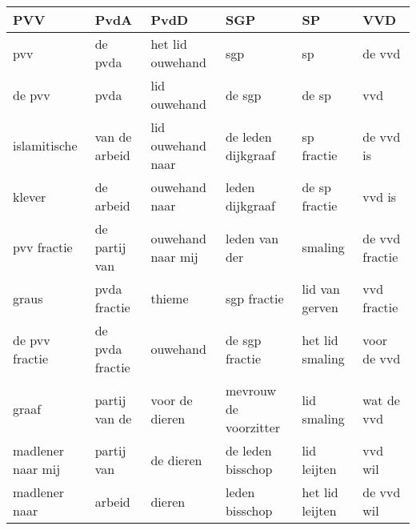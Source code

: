 \begin{tabular}{llllll}
\toprule
               PVV &             PvdA &               PvdD &                    SGP &               SP &             VVD \\
\midrule
               pvv &          de pvda &   het lid ouwehand &                    sgp &               sp &          de vvd \\
            de pvv &             pvda &       lid ouwehand &                 de sgp &            de sp &             vvd \\
      islamitische &    van de arbeid &  lid ouwehand naar &     de leden dijkgraaf &       sp fractie &       de vvd is \\
            klever &        de arbeid &      ouwehand naar &        leden dijkgraaf &    de sp fractie &          vvd is \\
       pvv fractie &    de partij van &  ouwehand naar mij &          leden van der &          smaling &  de vvd fractie \\
             graus &     pvda fractie &             thieme &            sgp fractie &   lid van gerven &     vvd fractie \\
    de pvv fractie &  de pvda fractie &           ouwehand &         de sgp fractie &  het lid smaling &     voor de vvd \\
             graaf &    partij van de &     voor de dieren &  mevrouw de voorzitter &      lid smaling &      wat de vvd \\
 madlener naar mij &       partij van &          de dieren &      de leden bisschop &      lid leijten &         vvd wil \\
     madlener naar &           arbeid &             dieren &         leden bisschop &  het lid leijten &      de vvd wil \\
\bottomrule
\end{tabular}
